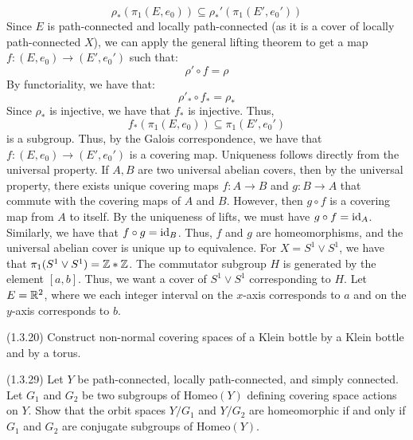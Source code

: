 \documentclass[12pt]{article}
\begin{document}
\begin{solution}
    \[ \rho_*(\pi_1(E, e_0)) \subseteq \rho_*'(\pi_1(E', e_0'))\]
    Since $E$ is path-connected and locally path-connected (as it is a cover of locally path-connected $X$), we can apply the general lifting theorem to get a map $f: (E, e_0) \to (E', e_0')$ such that:
    \[ \rho' \circ f = \rho \]
    By functoriality, we have that:
    \[ \rho'_* \circ f_* = \rho_* \]
    Since $\rho_*$ is injective, we have that $f_*$ is injective. Thus, 
    \[ f_*(\pi_1(E, e_0)) \subseteq \pi_1(E', e_0')\]
    is a subgroup. Thus, by the Galois correspondence, we have that $f: (E, e_0) \to (E', e_0')$ is a covering map. \bbni 
    Uniqueness follows directly from the universal property. If $A, B$ are two universal abelian covers, then by the universal property, there exists unique covering maps $f: A \to B$ and $g: B \to A$ that commute with the covering maps of $A$ and $B$. However, then $g \circ f$ is a covering map from $A$ to itself. By the uniqueness of lifts, we must have $g \circ f = \operatorname{id}_A$. Similarly, we have that $f \circ g = \operatorname{id}_B$. Thus, $f$ and $g$ are homeomorphisms, and the universal abelian cover is unique up to equivalence. \bbni 
    For $X = S^1 \vee S^1$, we have that $\pi_1(S^1 \vee S^1) = \mathbb Z * \mathbb Z$. The commutator subgroup $H$ is generated by the element $[a, b]$. Thus, we want a cover of $S^1 \vee S^1$ corresponding to $H$. Let $E = \mathbb R^2$, where we each integer interval on the $x$-axis corresponds to $a$ and on the $y$-axis corresponds to $b$. 
\end{solution}
\newpage

\begin{problem}{2}
    (1.3.20) Construct non-normal covering spaces of a Klein bottle by a Klein bottle and by a torus. 
\end{problem}

\begin{solution}
    
\end{solution}
\newpage

\begin{problem}{3}
    (1.3.29) Let $Y$ be path-connected, locally path-connected, and simply connected. Let $G_1$ and $G_2$ be two subgroups of $\mathrm{Homeo}(Y)$ defining covering space actions on $Y$. Show that the orbit spaces $Y/G_1$ and $Y/G_2$ are homeomorphic if and only if $G_1$ and $G_2$ are conjugate subgroups of $\mathrm{Homeo}(Y)$. 
\end{problem}

\begin{solution}
\end{solution}
\newpage
\end{document}
